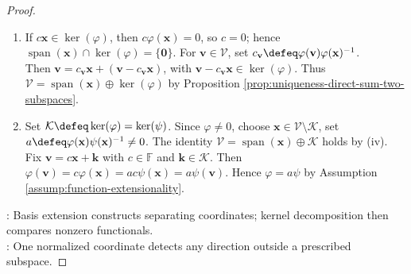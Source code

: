 \begin{proposition}
\begin{proof}
\begin{enumerate}[label=(\roman*)]
Since $\mathbf{x}\notin\operatorname{span}(\mathcal{B}_{\mathcal{U}})$, every finite relation on $\mathcal{B}_{\mathcal{U}}\cup\{\mathbf{x}\}$ has zero $\mathbf{x}$-coefficient and is then trivial by independence of $\mathcal{B}_{\mathcal{U}}$.\\
Thus $\mathcal{B}_{\mathcal{U}}\cup\{\mathbf{x}\}$ is linearly independent and extends to a Hamel basis $\mathcal{B}=\{\mathbf{b}_i\}_{i\in I}$ of $\mathcal{V}$ by Theorem \ref{thm:hamel-basis-extension}(iii).\\
Let $\{\varepsilon_i\}_{i\in I}$ denote its coordinate functionals, choose $i_0\in I$ with $\mathbf{b}_{i_0}=\mathbf{x}$, and set $\varphi\defeq\varepsilon_{i_0}$.\\
Then $\varphi\in\mathcal{V}'$ by Proposition \ref{prop:coordinate-functionals-for-hamel-basis}(i), $\varphi(\mathbf{x})=1$, and $\varphi|_{\mathcal{U}}=0$ by $\mathcal{U}=\operatorname{span}(\mathcal{B}_{\mathcal{U}})$.
\item[$(iv)$] If $c\mathbf{x}\in\ker(\varphi)$, then $c\varphi(\mathbf{x})=0$, so $c=0$; hence $\operatorname{span}(\mathbf{x})\cap\ker(\varphi)=\{\mathbf{0}\}$. For $\mathbf{v}\in\mathcal{V}$, set $c_{\mathbf{v}}\defeq\varphi(\mathbf{v})\varphi(\mathbf{x})^{-1}$.\\
Then $\mathbf{v}=c_{\mathbf{v}}\mathbf{x}+(\mathbf{v}-c_{\mathbf{v}}\mathbf{x})$, with $\mathbf{v}-c_{\mathbf{v}}\mathbf{x}\in\ker(\varphi)$. Thus $\mathcal{V}=\operatorname{span}(\mathbf{x})\oplus\ker(\varphi)$ by Proposition \ref{prop:uniqueness-direct-sum-two-subspaces}.
\item[$(v)$] Set $\mathcal{K}\defeq\ker(\varphi)=\ker(\psi)$. Since $\varphi\neq0$, choose $\mathbf{x}\in\mathcal{V}\setminus\mathcal{K}$, set $a\defeq\varphi(\mathbf{x})\psi(\mathbf{x})^{-1}\neq0$. The identity $\mathcal{V}=\operatorname{span}(\mathbf{x})\oplus\mathcal{K}$ holds by (iv).\\
Fix $\mathbf{v}=c\mathbf{x}+\mathbf{k}$ with $c\in\mathbb{F}$ and $\mathbf{k}\in\mathcal{K}$. Then $\varphi(\mathbf{v})=c\varphi(\mathbf{x})=ac\psi(\mathbf{x})=a\psi(\mathbf{v})$. Hence $\varphi=a\psi$ by Assumption \ref{assump:function-extensionality}.
\end{enumerate}
: Basis extension constructs separating coordinates; kernel decomposition then compares nonzero functionals.\\
: One normalized coordinate detects any direction outside a prescribed subspace.
\end{proof}
\end{proposition}

